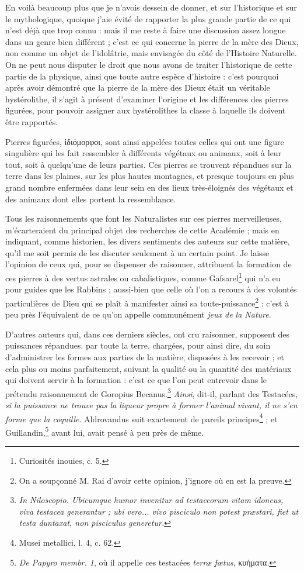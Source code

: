 \documentclass[a4paper, 11pt, oneside, polutonikogreek, french]{article}
\begin{document}
En voilà beaucoup plus que je n'avois dessein de donner, et sur l'historique et sur le mythologique, quoique j'aie évité de rapporter la plus grande partie de ce qui n'est déjà que trop connu : mais il me reste à faire une discussion assez longue dans un genre bien différent ; c'est ce qui concerne la pierre de la mère des Dieux, non comme un objet de l'idolâtrie, mais envisagée du côté de l'Histoire Naturelle. On ne peut nous disputer le droit que nous avons de traiter l'historique de cette partie de la physique, ainsi que toute autre espèce d'histoire : c'est pourquoi après avoir démontré que la pierre de la mère des Dieux était un véritable hystérolithe, il s'agit à présent d'examiner l'origine et les différences des pierres figurées, pour pouvoir assigner aux hystérolithes la classe à laquelle ils doivent être rapportés.

Pierres figurées, ἰδιόμορφοι, sont ainsi appelées toutes celles qui ont une figure singulière qui les fait ressembler à différents végétaux ou animaux, soit à leur tout, soit à quelqu'une de leurs parties. Ces pierres se trouvent répandues sur la terre dans les plaines, sur les plus hautes montagnes, et presque toujours en plus grand nombre enfermées dans leur sein en des lieux très-éloignés des végétaux et des animaux dont elles portent la ressemblance.

Tous les raisonnements que font les Naturalistes sur ces pierres merveilleuses, m'écarteraient du principal objet des recherches de cette Académie ; mais en indiquant, comme historien, les divers sentiments des auteurs sur cette matière, qu'il me soit permis de les discuter seulement à un certain point. Je laisse l'opinion de ceux qui, pour se dispenser de raisonner, attribuent la formation de ces pierres à des vertus astrales ou cabalistiques, comme Gafsarel\footnote{Curiosités inouies, c. 5.} qui n'a eu pour guides que les Rabbins ; aussi-bien que celle où l'on a recours à des volontés particulières de Dieu qui se plaît à manifester ainsi sa toute-puissance\footnote{On a soupçonné M. Rai d'avoir cette opinion, j'ignore où en est la preuve.} : c'est à peu près l'équivalent de ce qu'on appelle communément \emph{jeux de la Nature}.

D'autres auteurs qui, dans ces derniers siècles, ont cru raisonner, supposent des puissances répandues. par toute la terre, chargées, pour ainsi dire, du soin d'administrer les formes aux parties de la matière, disposées à les recevoir ; et cela plus ou moins parfaitement, suivant la qualité ou la quantité des matériaux qui doivent servir à la formation : c'est ce que l'on peut entrevoir dans le prétendu raisonnement de Goropius Becanus.\footnote{\emph{In Niloscopio. Ubicumque humor invenitur ad testaceorum vitam idoneus, viva testacea generantur ; ubi vero... vivo pisciculo non potest præstari, fiet ut testa duntaxat, non pisciculus generetur.}} \emph{Ainsi}, dit-il, parlant des Testacées, \emph{si la puissance ne trouve pas la liqueur propre à former l'animal vivant, il ne s'en forme que la coquille}. Aldrovandus suit exactement de pareils principes\footnote{Musei metallici, l. 4, c. 62.} ; et Guillandin,\footnote{\emph{De Papyro membr. 1}, où il appelle ces testacées \emph{terræ fœtus}, κυήματα.} avant lui, avait pensé à peu près de même.
\end{document}
